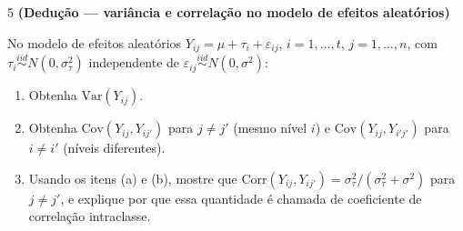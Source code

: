 \documentclass[11pt]{article}
\begin{document}
\begin{questao}{5} \textbf{(Dedução --- variância e correlação no modelo de efeitos aleatórios)}

No modelo de efeitos aleatórios $Y_{ij} = \mu + \tau_i + \varepsilon_{ij}$, $i=1,\ldots,t$,
$j=1,\ldots,n$, com $\tau_i \overset{iid}{\sim} N(0,\sigma_\tau^2)$ independente de
$\varepsilon_{ij}\overset{iid}{\sim} N(0,\sigma^2)$:

\begin{enumerate}[label=(\alph*)]
  \item Obtenha $\mathrm{Var}(Y_{ij})$.
  \item Obtenha $\mathrm{Cov}(Y_{ij}, Y_{ij'})$ para $j\neq j'$ (mesmo nível $i$) e
    $\mathrm{Cov}(Y_{ij}, Y_{i'j'})$ para $i \neq i'$ (níveis diferentes).
  \item Usando os itens (a) e (b), mostre que $\mathrm{Corr}(Y_{ij},Y_{ij'}) =
    \sigma_\tau^2/(\sigma_\tau^2+\sigma^2)$ para $j\neq j'$, e explique por que essa quantidade é
    chamada de coeficiente de correlação intraclasse.
\end{enumerate}
\end{questao}
\end{document}
